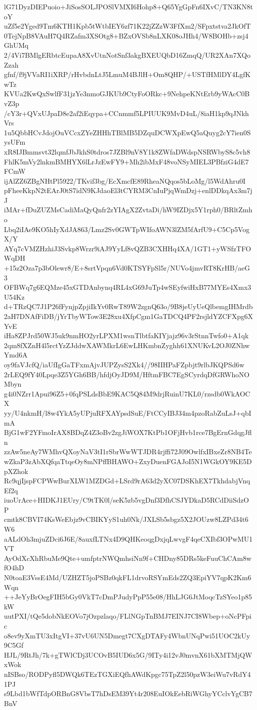 lG71DyzDIEPuoio+JiSosSOLJPOSlVMXI6Hohp8+Q65YgGpFn6IXvC/TN3KN8toY
uZf5e2Yged9Tm6KTH1Kpb5tWtbIEY6zf71K22jZZzW3FfXm2/SFpxtstva2JkOfT
0TejNpB8VAuH7Q4RZafm3XSOtg8+BZxOVSb8nLXK08oJHh4/W8BOHb+zsj4GhUMq
2/4Vi7BMlgERbtcEupaA8XvUtnNotSnf3akgBXEUQbD16ZmqQ/UR2XAn7XQoZzah
gfnf/f9jVVaRI1iXRP/rHvbdnLtJ5LmuM4BJlH+Om8QHP/+USTfHMlDY4LgfKwTz
KVUa2KwQxSwlfF31jzYe3nmoGJKUb9CtyFoORkc+9NehpeKNtErb9yWAcC0BvZ3p
/cY3r+QVxUJpaD8e2af2iEqypa+CCnmmf5LPIUUK9MvD4uL/8iaH1kp9qJNkhVrs
1u5QbbHCvJdojOuVCcxZYeZHHhTBlMB5DZquDCWXpEwQ5aQuyg2cY7ien0SysUFm
xR8IJBmmsvt32lqmfJbJkhS0tdros7JZBl9nV8Y1k8ZWfaDWdspNSRWbyS8c5vh8
FhlK5mVy2lnkmBMHYX6lLrJzEwFY9+Mh2ibMxF48voNSyMIEL3PBfziG4dE7FCmW
ijAlZZ6ZBgNHtPl5922/TKvif3bg/EcXmcfE89RheaNQqos5bLoMg/l5WdAhru0I
pFheeKkpN2tEArJ0tS7idN9KJdaoEl3tCYRM3CnIuPjqWmDzj+enlDDkqAx3m7jJ
iMAr+fDuZUZMsCadiMaQyQnfr2zYIAgX2ZvtaDi/hW9IZDjx5Y1rph0/BRltZmho
Lbq2iIAe9KO5hIyXdJA863/Lmz2Sv0GWTpWIfoAWN3lZM5fArfU9+C5Cp5VogX/Y
AYq7cVMZHzhiJ3Svkp8Wrzr9iAJ9YyLf8vQZB3CXHHq4XA/1GT1+yWSfzTFOWqDH
+15z2Oza7p3bOlewr8/E+8srtVpqn6Vd0KTSYFpSl5r/NUVo4jmvRT8KrHB/aeG3
OFBWq7g6EQMze45xGTDAnbynq4RL4xG69JuTp4wSEyfwiHxB77MYEs4Xmx3U54Kz
d+TRzQC7J1P26fFynjpZpjiIkYv0RwT89W2zgnQ63o/9B8jeUyUeQlbemgIHMrdb
2aH7DNAfFiDB/jYrTbyWTow3E28xu4XfpCgm1GaTDCQ4PF2rsjldYZCFXpg6XYvE
iHa8ZPJrd50WJ5uk9nmHO2yrLPXM1wsnTlbtfaKIYjajz96v3rStnnTwfo0+A1qk
2qm8fXZnH4l5rctYzZJddwXAWMkrL6EwLHKmbnZyghh61XNUKvL2OJ0ZNhwYmd6A
oy9faVJcfQ/iaUfIgGaTFxmAjvJUPZysS2Xk4//98IIHPaFZpbjt9rlbJKQPSd6w
2rLEQ9fY40Lpqe3Z5YGh6BB/hfdjOyJD9M/HftmFBC7EgSCyrdqDfGRWhoNOMbyn
g4i0NZrr1Apui96Z5+0fqPSLdsBbE9KAC5Q84M9drjRuinU7KL0/rzsdb0WkAOCX
yy/U4nkmH/l8w4YkA5yUPjuRFXAYpsdSuE/FtCCyIBJ34m4pzoRabZuLsJ+qbImA
BjG1wF2YFmoIrAX8BDqZ4Z3oBv2zgJiWOX7KtPb1OFjHvb1rce7BgErnGdqgJfln
zzAw5neAy7WMhvQXoyNaV3tI1rSbrWwWTJDR4rjffi72J09OwlfxIBxeZr8NB4Te
wZkaP3zAbXQfqaTtqeOy8mNPffBHAWO+ZxyDuenFGAJoI5N1WGkOY9KE5DpXZhok
Rc9qjIjspFCPWwBurXLW1MZDGd+LSrd9rA63d2yXC07DSKhEX7TkhdabjVnqEf2q
iuoUrAce+HIDKJ1EUry/C9tTK0l/seK5zb5vgDnf3DfhCSJYDkaD5RCdDiiSdzOP
cmtk8CBVI74KsWeEbjz9vCBIKYyS1uh0Nk/JXLSb5sbgz5X2JOUzw8LZPd34t6W6
aALdOh3mjuZDci6J6E/8auxfLTNx4D9QHKeoqgDxjqLwvgF4qeCXIbf3OPwMU1VT
AyOdXcXhRbuMe9Qte+umfptrNWQmhsiNn9f+CHDny85DRs5keFuuChCAm8wfO4hD
N0toaE3VssE4Md/UZHZT5joPSBz0qkFL1drvoRSYmEds2ZQ3EpiYV7qpK2Km6Wqn
++JeYyBrOegFIH5bGy0VkT7cDmPJudyPpP55e08/HhLJG6JtMoqcTzSYeo1p85kW
uutPXI/tQe5dobNkEOVo7jOzpzlaqo/FLlNGpTnBMJ7EINJ7CI8Wbep+oNcPFpic
o8ev9yXmTU3xItgVI+37vU6UN5Dmegt7CXgDTAFy4WbnUNqPwi51UOC2kUy9C5Gf
HJL/9RtJh/7k+gTWlCDj3UCOvB5IUD6x5G/9ITy4i12vJ0mvnX61bXMTMjQWxWok
nISBso/RODPyfl5DWQk6TEzTGXiEQfhAWdKpgc75TpZ2l50pzW3eiWu7vRdY41PJ
s9Lbd1bWfTdpORBnG8VbsT7hDsEM39Yt4r208EuIOkEebRiWGhyYCclvYgCB7BnV
